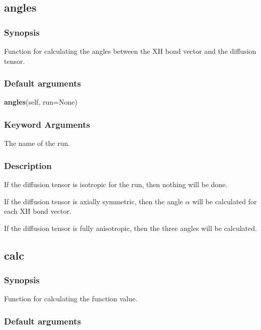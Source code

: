 

\newpage

\subsection{angles}


\subsubsection{Synopsis}

Function for calculating the angles between the XH bond vector and the diffusion tensor.

\subsubsection{Default arguments}

\textsf{\textbf{angles}(self, run=None)}


\subsubsection{Keyword Arguments}

  The name of the run.

\subsubsection{Description}

If the diffusion tensor is isotropic for the run, then nothing will be done.

If the diffusion tensor is axially symmetric, then the angle $\alpha$ will be calculated for
each XH bond vector.

If the diffusion tensor is fully anisotropic, then the three angles will be calculated.


\newpage

\subsection{calc}


\subsubsection{Synopsis}

Function for calculating the function value.

\subsubsection{Default arguments}

